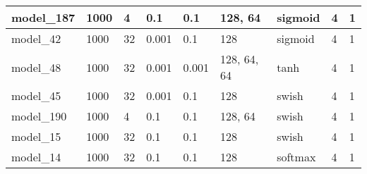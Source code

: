 \begin{tabular}{|l|l|l|l|l|l|l|l|l|}
model\_187     & 1000           & 4            & 0.1          & 0.1          & 128, 64     & sigmoid      & 4           & 1            \\ \hline
model\_42      & 1000           & 32           & 0.001        & 0.1          & 128         & sigmoid      & 4           & 1            \\ \hline
model\_48      & 1000           & 32           & 0.001        & 0.001        & 128, 64, 64 & tanh         & 4           & 1            \\ \hline
model\_45      & 1000           & 32           & 0.001        & 0.1          & 128         & swish        & 4           & 1            \\ \hline
model\_190     & 1000           & 4            & 0.1          & 0.1          & 128, 64     & swish        & 4           & 1            \\ \hline
model\_15      & 1000           & 32           & 0.1          & 0.1          & 128         & swish        & 4           & 1            \\ \hline
model\_14      & 1000           & 32           & 0.1          & 0.1          & 128         & softmax      & 4           & 1            \\ \hline
\end{tabular}